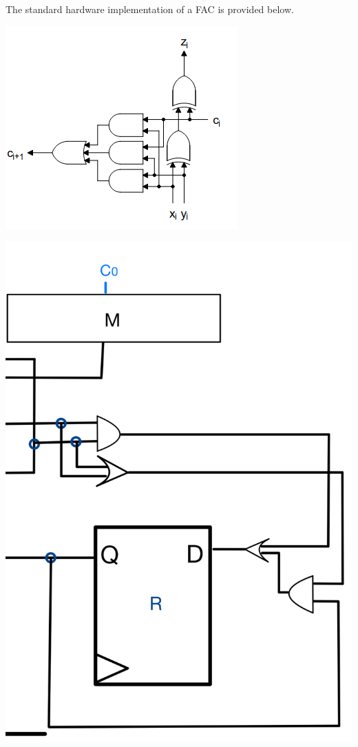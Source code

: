 \documentclass[12pt, letterpaper]{article}
\begin{document}
The standard hardware implementation of a FAC is provided below.

\begin{center}
\includegraphics[scale=0.5]{Documentation/FAC}
\end{center}

\begin{center}
\includegraphics[scale=0.3]{Documentation/ALU2}
\end{center}
\end{document}
